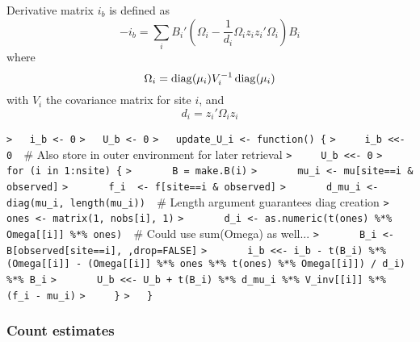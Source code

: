 \documentclass[a4paper]{article}
\begin{document}
\label{Hessian}\label{Scoring}
Derivative matrix $i_b$ is defined as
\begin{equation}
  -i_b = \sum_i B_i' \left(\Omega_i - \frac{1}{d_i}\Omega_i z_i z_i' \Omega_i\right) B_i \label{i_b}
\end{equation}
where
\begin{equation}
  \Omega_i = \operatorname{diag}(\mu_i) V_i^{-1} \operatorname{diag}(\mu_i) \label{Omega_i}
\end{equation}
with $V_i$ the covariance matrix for site $i$, and
\begin{equation}
  d_i = z_i' \Omega_i z_i \label{d_i}
\end{equation}\par
\verb~>   i_b <- 0~\newline
\verb~>   U_b <- 0~\newline
\verb~>   update_U_i <- function() {~\newline
\verb~>     i_b <<- 0  ~{\sffamily\# Also store in outer environment for later retrieval}\newline
\verb~>     U_b <<- 0~\newline
\verb~>     for (i in 1:nsite) {~\newline
\verb~>       B = make.B(i)~\newline
\verb~>       mu_i <- mu[site==i & observed]~\newline
\verb~>       f_i  <- f[site==i & observed]~\newline
\verb~>       d_mu_i <- diag(mu_i, length(mu_i))  ~{\sffamily\# Length argument guarantees diag creation}\newline
\verb~>       ones <- matrix(1, nobs[i], 1)~\newline
\verb~>       d_i <- as.numeric(t(ones) %*% Omega[[i]] %*% ones)  ~{\sffamily\# Could use sum(Omega) as well...}\newline
\verb~>       B_i <- B[observed[site==i], ,drop=FALSE]~\newline
\verb~>       i_b <<- i_b - t(B_i) %*% (Omega[[i]] - (Omega[[i]] %*% ones %*% t(ones) %*% Omega[[i]]) / d_i) %*% B_i~\newline
\verb~>       U_b <<- U_b + t(B_i) %*% d_mu_i %*% V_inv[[i]] %*% (f_i - mu_i)~\newline
\verb~>     }~\newline
\verb~>   }~\par



\subsubsection{Count estimates}\par
\end{document}
